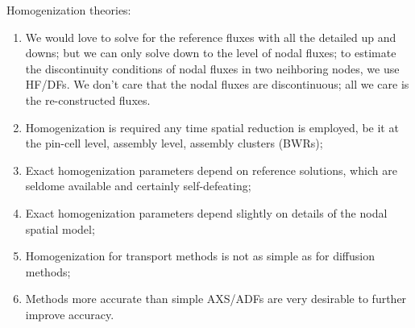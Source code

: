 \documentclass{school-22.211-notes}
\begin{document}
\clearpage
{}
Homogenization theories:
\begin{enumerate}
\item We would love to solve for the reference fluxes with all the detailed up and downs; but we can only solve down to the level of nodal fluxes; to estimate the discontinuity conditions of nodal fluxes in two neihboring nodes, we use HF/DFs. We don't care that the nodal fluxes are discontinuous; all we care is the re-constructed fluxes. 
\item Homogenization is required any time spatial reduction is employed, be it at the pin-cell level, assembly level, assembly clusters (BWRs); 
\item Exact homogenization parameters depend on reference solutions, which are seldome available and certainly self-defeating;
\item Exact homogenization parameters depend slightly on details of the nodal spatial model;
\item Homogenization for transport methods is not as simple as for diffusion methods;
\item Methods more accurate than simple AXS/ADFs are very desirable to further improve accuracy. 
\end{enumerate}
\end{document}
